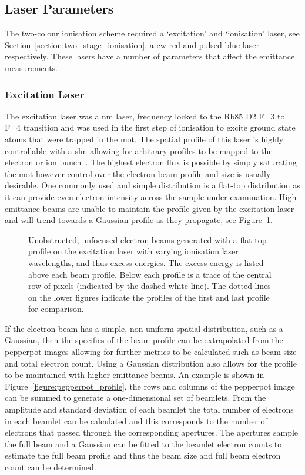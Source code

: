 \subsection{Laser Parameters}
The two-colour ionisation scheme required a `excitation' and `ionisation' laser, see Section~\ref{section:two_stage_ionisation}, a \gls{cw} red and pulsed blue laser respectively.
These lasers have a number of parameters that affect the emittance measurements.

\subsubsection{Excitation Laser}
The excitation laser was a \unit[780]{nm} laser, frequency locked to the Rb85 D2 F=3 to F=4 transition and was used in the first step of ionisation to excite ground state atoms that were trapped in the \gls{mot}.
The spatial profile of this laser is highly controllable with a \gls{slm} allowing for arbitrary profiles to be mapped to the electron or ion bunch~\cite{mcculloch_arbitrarily_2011}.
The highest electron flux is possible by simply saturating the \gls{mot} however control over the electron beam profile and size is usually desirable.
One commonly used and simple distribution is a flat-top distribution as it can provide even electron intensity across the sample under examination.
High emittance beams are unable to maintain the profile given by the excitation laser and will trend towards a Gaussian profile as they propagate, see Figure~\ref{figure:flat_top}.

\begin{figure}
    \center
    
    \caption[Blurring of flat-top electron profile with emittance.]{Unobstructed, unfocused electron beams generated with a flat-top profile on the excitation laser with varying ionisation laser wavelengths, and thus excess energies. The excess energy is listed above each beam profile. Below each profile is a trace of the central row of pixels (indicated by the dashed white line). The dotted lines on the lower figures indicate the profiles of the first and last profile for comparison.}
    \label{figure:flat_top}
\end{figure}

If the electron beam has a simple, non-uniform spatial distribution, such as a Gaussian, then the specifics of the beam profile can be extrapolated from the pepperpot images allowing for further metrics to be calculated such as beam size and total electron count.
Using a Gaussian distribution also allows for the profile to be maintained with higher emittance beams.
An example is shown in Figure~\ref{figure:pepperpot_profile}, the rows and columns of the pepperpot image can be summed to generate a one-dimensional set of beamlets.
From the amplitude and standard deviation of each beamlet the total number of electrons in each beamlet can be calculated and this corresponds to the number of electrons that passed through the corresponding apertures.
The apertures sample the full beam and a Gaussian can be fitted to the beamlet electron counts to estimate the full beam profile and thus the beam size and full beam electron count can be determined.

